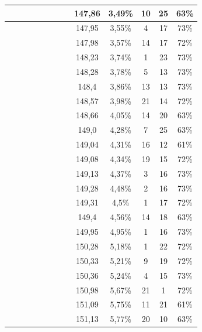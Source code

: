 \begin{center}
\begin{longtable}{|c|c|c|c|c|c|c|c|c|c|c|c|c|}
 \x &  \x &  \x &  &  &  &  &  \x & 147,86 & 3,49\% & 10 & 25 & 63\% \\ \hline
 \x &  &  &  &  \x &  \x &  \x &  \x & 147,95 & 3,55\% & 4 & 17 & 73\% \\ \hline
 \x &  &  \x &  &  &  \x &  &  \x & 147,98 & 3,57\% & 14 & 17 & 72\% \\ \hline
 \x &  &  &  &  \x &  \x &  \x &  \x & 148,23 & 3,74\% & 1 & 23 & 73\% \\ \hline
 \x &  \x &  &  \x &  &  \x &  \x &  \x & 148,28 & 3,78\% & 5 & 13 & 73\% \\ \hline
 \x &  &  &  \x &  \x &  \x &  \x &  \x & 148,4 & 3,86\% & 13 & 13 & 73\% \\ \hline
 \x &  \x &  &  \x &  &  \x &  &  \x & 148,57 & 3,98\% & 21 & 14 & 72\% \\ \hline
 \x &  \x &  \x &  \x &  &  &  &  \x & 148,66 & 4,05\% & 14 & 20 & 63\% \\ \hline
 \x &  \x &  \x &  \x &  &  &  &  \x & 149,0 & 4,28\% & 7 & 25 & 63\% \\ \hline
 \x &  \x &  &  &  \x &  &  &  \x & 149,04 & 4,31\% & 16 & 12 & 61\% \\ \hline
 \x &  &  &  \x &  &  \x &  &  \x & 149,08 & 4,34\% & 19 & 15 & 72\% \\ \hline
 \x &  &  \x &  &  &  \x &  \x &  \x & 149,13 & 4,37\% & 3 & 16 & 73\% \\ \hline
 \x &  \x &  \x &  &  &  \x &  \x &  \x & 149,28 & 4,48\% & 2 & 16 & 73\% \\ \hline
 \x &  \x &  &  \x &  \x &  \x &  &  \x & 149,31 & 4,5\% & 1 & 17 & 72\% \\ \hline
 \x &  &  \x &  &  \x &  &  &  \x & 149,4 & 4,56\% & 14 & 18 & 63\% \\ \hline
 \x &  \x &  \x &  &  &  \x &  &  \x & 149,95 & 4,95\% & 1 & 16 & 73\% \\ \hline
 \x &  &  \x &  &  \x &  \x &  \x &  \x & 150,28 & 5,18\% & 1 & 22 & 72\% \\ \hline
 \x &  \x &  \x &  \x &  &  \x &  &  \x & 150,33 & 5,21\% & 9 & 19 & 72\% \\ \hline
 \x &  \x &  &  &  &  \x &  \x &  \x & 150,36 & 5,24\% & 4 & 15 & 73\% \\ \hline
 \x &  \x &  &  &  &  \x &  &  \x & 150,98 & 5,67\% & 21 & 1 & 72\% \\ \hline
 \x &  &  &  &  \x &  &  &  \x & 151,09 & 5,75\% & 11 & 21 & 61\% \\ \hline
 \x &  &  \x &  \x &  &  &  &  \x & 151,13 & 5,77\% & 20 & 10 & 63\% \\ \hline

\end{longtable}
\end{center}
